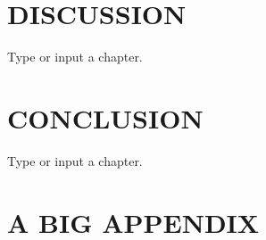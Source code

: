 \documentclass[dissertation]{uathesis}
\begin{document}
\begin{body}
\chapter{DISCUSSION}
Type or input{} a chapter. \cite{rocket-themoon2167}

\chapter{CONCLUSION}
Type or input{} a chapter. \cite{rocket-themoon2167}






\appendix

\chapter{A BIG APPENDIX}

\end{body}
\end{document}
